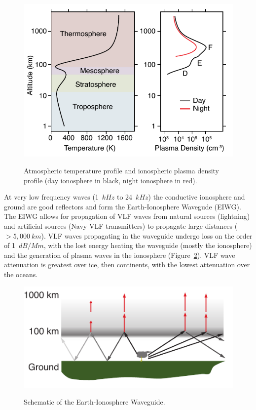 \begin{figure}[ht!]
	\centering
	\includegraphics[scale=1]{Introduction/Figures/ionosphere.pdf}\\
	\caption{Atmospheric temperature profile and ionospheric plasma density profile (day ionosphere in black, night ionosphere in red).
		     }
	\label{intro:fig:ionosphere}
\end{figure}

At very low frequency waves (1~$kHz$ to 24~$kHz$) the conductive ionosphere and ground are good reflectors and form the Earth-Ionosphere Wavegude (EIWG).
The EIWG allows for propagation of VLF waves from natural sources (lightning) and artificial sources (Navy VLF transmitters) to propagate large distances ($>5,000~km$).
VLF waves propagating in the waveguide undergo loss on the order of 1~$dB/Mm$, with the lost energy  heating the waveguide (mostly the ionosphere) and the generation of plasma waves in the ionosphere (Figure~\ref{intro:fig:eiwg}).
VLF wave attenuation is greatest over ice, then continents, with the lowest attenuation over the oceans.

\begin{figure}[ht!]
	\centering
	\includegraphics[scale=1]{Introduction/Figures/eiwg.pdf}\\
	\caption{Schematic of the Earth-Ionosphere Waveguide.}
	\label{intro:fig:eiwg}
\end{figure}


